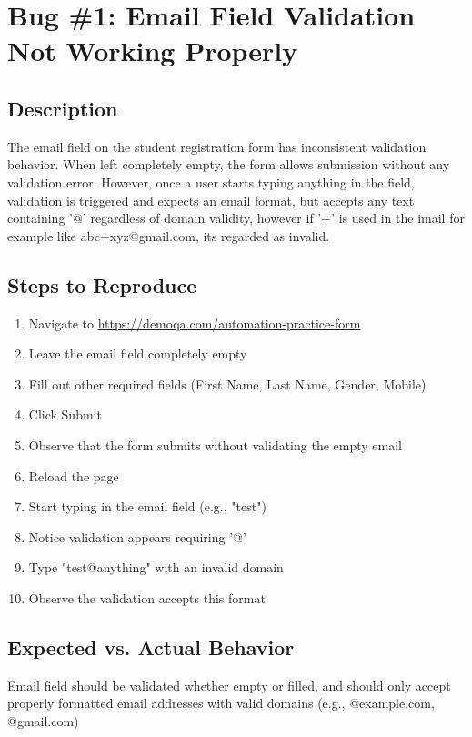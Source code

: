 \section{Bug \#1: Email Field Validation Not Working Properly}


\subsection*{Description}
The email field on the student registration form has inconsistent validation behavior. When left completely empty, the form allows submission without any validation error. However, once a user starts typing anything in the field, validation is triggered and expects an email format, but accepts any text containing '@' regardless of domain validity, however if '+' is used in the imail for example like abc+xyz@gmail.com, its regarded as invalid.

\subsection*{Steps to Reproduce}
\begin{enumerate}
    \item Navigate to \url{https://demoqa.com/automation-practice-form}
    \item Leave the email field completely empty
    \item Fill out other required fields (First Name, Last Name, Gender, Mobile)
    \item Click Submit
    \item Observe that the form submits without validating the empty email
    \item Reload the page
    \item Start typing in the email field (e.g., "test")
    \item Notice validation appears requiring '@'
    \item Type "test@anything" with an invalid domain
    \item Observe the validation accepts this format
\end{enumerate}

\subsection*{Expected vs. Actual Behavior}
\begin{tcolorbox}[colback=gray!10, colframe=gray!40, title=Expected Behavior]
Email field should be validated whether empty or filled, and should only accept properly formatted email addresses with valid domains (e.g., @example.com, @gmail.com)
\end{tcolorbox}

